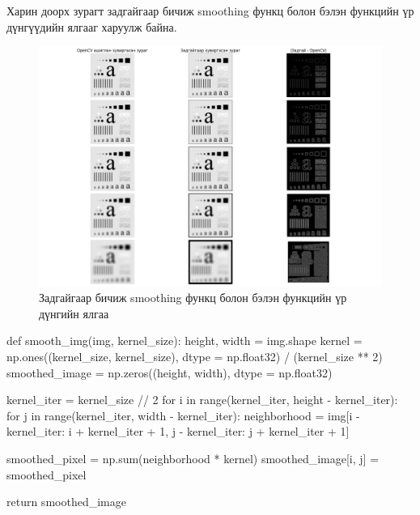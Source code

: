 \documentclass[a4paper]{article}
\begin{document}
Харин доорх зурагт задгайгаар бичиж smoothing функц болон бэлэн функцийн үр дүнгүүдийн ялгааг харуулж байна.
\begin{figure}[H]
  \centering
  \includegraphics[scale = 0.30]{smoothing_3.png}
  \caption[Intensity 1]{Задгайгаар бичиж smoothing функц болон бэлэн функцийн үр дүнгийн ялгаа}
\end{figure}
\begin{python}
def smooth_img(img, kernel_size):
    height, width = img.shape
    kernel = np.ones((kernel_size, kernel_size), dtype = np.float32) / (kernel_size ** 2)
    smoothed_image = np.zeros((height, width), dtype = np.float32)

    kernel_iter = kernel_size // 2
    for i in range(kernel_iter, height - kernel_iter):
        for j in range(kernel_iter, width - kernel_iter):
            neighborhood = img[i - kernel_iter: i + kernel_iter + 1, j - kernel_iter: j + kernel_iter + 1]

            smoothed_pixel = np.sum(neighborhood * kernel)
            smoothed_image[i, j] = smoothed_pixel
    
    return smoothed_image
\end{python}
\end{document}
